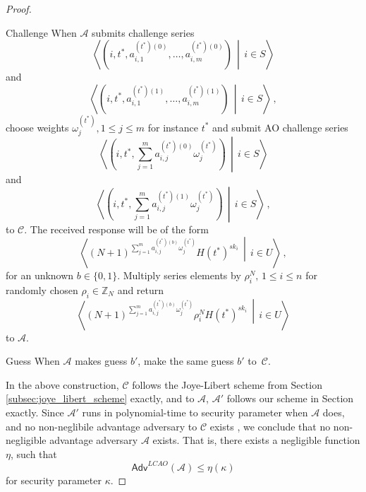 \documentclass[10pt,letterpaper,oneside,twocolumn,journal]{IEEEtran}
\theoremstyle{definition}
\theoremstyle{definition}
\theoremstyle{remark}
\begin{document}
\begin{proof}
\begin{LaTeXdescription}
        \item[Challenge] When $\mathcal{A}$ submits challenge series
        \begin{equation*}
            \left\langle\left(i,t^*,a^{(t^*)(0)}_{i,1},\dots,a^{(t^*)(0)}_{i,m}\right)\,\middle|\,i \in S\right\rangle
        \end{equation*}
        and
        \begin{equation*}
            \left\langle\left(i,t^*,a^{(t^*)(1)}_{i,1},\dots,a^{(t^*)(1)}_{i,m}\right)\,\middle|\, i \in S\right\rangle\,,
        \end{equation*}
        choose weights $\omega^{(t^*)}_j,1 \leq j \leq m$ for instance $t^*$ and submit AO challenge series
        \begin{equation*}
            \left\langle\left(i,t^*,\sum^m_{j=1}a^{(t^*)(0)}_{i,j}\omega^{(t^*)}_j\right)\,\middle|\,i \in S\right\rangle
        \end{equation*}
        and
        \begin{equation*}
            \left\langle\left(i,t^*,\sum^m_{j=1}a^{(t^*)(1)}_{i,j}\omega^{(t^*)}_j\right)\,\middle|\,i \in S\right\rangle\,,
        \end{equation*}
        to $\mathcal{C}$. The received response will be of the form 
        \begin{equation*}
            \left\langle(N+1)^{\sum^m_{j=1}a^{(t^*)(b)}_{i,j}\omega^{(t^*)}_j}H(t^*)^{sk_i}\,\middle|\,i\in U\right\rangle\,,
        \end{equation*}
        for an unknown $b \in \{0,1\}$. Multiply series elements by $\rho_i^N,\,1 \leq i \leq n$ for randomly chosen $\rho_i \in \mathbb{Z}_N$ and return
        \begin{equation*}
            \left\langle(N+1)^{\sum^m_{j=1}a^{(t^*)(b)}_{i,j}\omega^{(t^*)}_j}\rho_i^N H(t^*)^{sk_i}\,\middle|\,i\in U\right\rangle
        \end{equation*}
        to $\mathcal{A}$.
        \item[Guess] When $\mathcal{A}$ makes guess $b'$, make the same guess $b'$ to~$\mathcal{C}$.
    \end{LaTeXdescription}

    In the above construction, $\mathcal{C}$ follows the Joye-Libert scheme from Section \ref{subsec:joye_libert_scheme} exactly, and to $\mathcal{A}$, $\mathcal{A}'$ follows our scheme in Section  exactly. Since $\mathcal{A}'$ runs in polynomial-time to security parameter when $\mathcal{A}$ does, and no non-neglibile advantage adversary to $\mathcal{C}$ exists \cite{joyeScalableSchemePrivacyPreserving2013}, we conclude that no non-negligible advantage adversary $\mathcal{A}$ exists. That is, there exists a negligible function $\eta$, such that
    \begin{equation*}
        \mathsf{Adv}^{LCAO}(\mathcal{A}) \leq \eta(\kappa)
    \end{equation*}
    for security parameter $\kappa$.
\end{proof}
\end{document}
